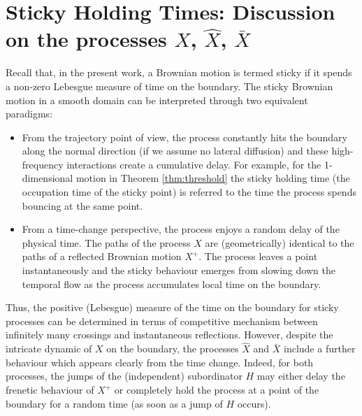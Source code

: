 \documentclass[11pt,a4paper]{article}
\newcommand{\magenta}{black}
\begin{document}
\section{Sticky Holding Times: Discussion on the processes $X$, $\hat{X}$, $\bar{X}$}
\label{sec:comparisonXhatX}
{\color{\magenta} Recall that, in the present work, a Brownian motion is termed sticky if it spends a non-zero Lebesgue measure of time on the boundary.} The sticky Brownian motion in a smooth domain can be interpreted through two equivalent paradigms: 
\begin{itemize}
\item[1)] From the trajectory point of view, the process constantly hits the boundary along the normal direction (if we assume no lateral diffusion) and these high-frequency interactions create a cumulative delay. For example, for  the 1-dimensional motion in Theorem \ref{thm:threshold} the sticky holding time (the occupation time of the sticky point) is referred to the time the process spends bouncing at the same point.
\item[2)] From a time-change perspective, the process enjoys a random delay of the physical time. The paths of the process $X$ are (geometrically) identical to the paths of a reflected Brownian motion $X^+$. The process leaves a point instantaneously and the sticky behaviour emerges from slowing down the temporal flow as the process accumulates local time on the boundary. 
\end{itemize}
Thus, the positive (Lebesgue) measure of the time on the boundary for sticky processes can be determined in terms of competitive mechanism between infinitely many crossings and instantaneous reflections. However, despite the intricate dynamic of $X$ on the boundary, the processes $\hat{X}$ and $\bar{X}$ include a further behaviour which appears clearly from the time change. Indeed, for both processes, the jumps of the (independent) subordinator $H$ may either delay the frenetic behaviour of $X^+$ or completely hold the process at a point of the boundary for a random time (as soon as a jump of $H$ occurs).
\end{document}
